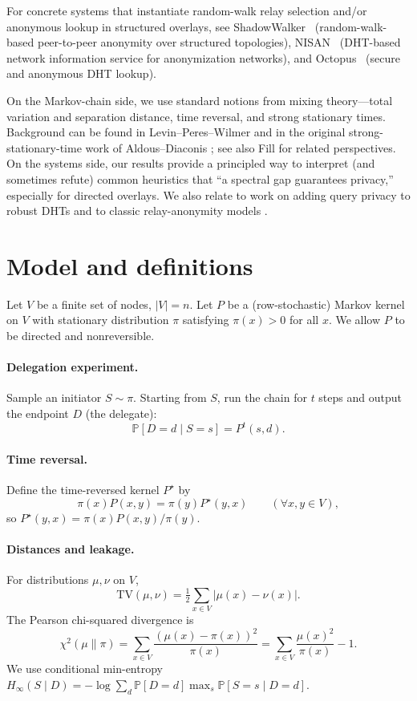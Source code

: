 \documentclass[11pt]{article}
\newcommand{\TV}{\mathrm{TV}}
\newcommand{\Prb}{\mathbb{P}}
\begin{document}
For concrete systems that instantiate random-walk relay selection and/or anonymous lookup in structured overlays, see ShadowWalker~\cite{shadowwalker} (random-walk-based peer-to-peer anonymity over structured topologies), NISAN~\cite{nisan} (DHT-based network information service for anonymization networks), and Octopus~\cite{octopus} (secure and anonymous DHT lookup).

On the Markov-chain side, we use standard notions from mixing theory---total
variation and separation distance, time reversal, and strong stationary times.
Background can be found in Levin--Peres--Wilmer \cite{lpw} and in the original
strong-stationary-time work of Aldous--Diaconis \cite{aldousdiaconis}; see also
Fill \cite{fill} for related perspectives. On the systems side, our results
provide a principled way to interpret (and sometimes refute) common heuristics
that ``a spectral gap guarantees privacy,'' especially for directed overlays.
We also relate to work on adding query privacy to robust DHTs \cite{backes} and
to classic relay-anonymity models \cite{reiterrubin}.

\section{Model and definitions}\label{sec:model}
Let $V$ be a finite set of nodes, $|V|=n$. Let $P$ be a (row-stochastic) Markov
kernel on $V$ with stationary distribution $\pi$ satisfying $\pi(x)>0$ for all
$x$. We allow $P$ to be directed and nonreversible.

\paragraph{Delegation experiment.}
Sample an initiator $S\sim \pi$. Starting from $S$, run the chain for $t$ steps
and output the endpoint $D$ (the delegate):
\[
\Prb[D=d\mid S=s] = P^t(s,d).
\]

\paragraph{Time reversal.}
Define the time-reversed kernel $P^\star$ by
\begin{equation}\label{eq:rev}
\pi(x)P(x,y)=\pi(y)P^\star(y,x)\qquad(\forall x,y\in V),
\end{equation}
so $P^\star(y,x)=\pi(x)P(x,y)/\pi(y)$.

\paragraph{Distances and leakage.}
For distributions $\mu,\nu$ on $V$,
\[
\TV(\mu,\nu)=\tfrac12\sum_{x\in V}|\mu(x)-\nu(x)|.
\]
The Pearson chi-squared divergence is
\[
\chi^2(\mu\|\pi)=\sum_{x\in V}\frac{(\mu(x)-\pi(x))^2}{\pi(x)}
=\sum_{x\in V}\frac{\mu(x)^2}{\pi(x)}-1.
\]
We use conditional min-entropy
$H_\infty(S\mid D)= -\log \sum_d \Prb[D=d]\max_s \Prb[S=s\mid D=d]$.
\end{document}
